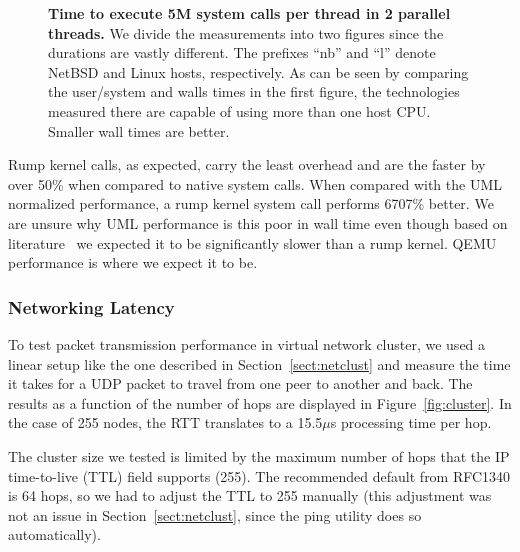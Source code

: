 \begin{figure}
\caption[Time to execute 5M system calls per thread in 2 parallel threads]{
\textbf{Time to execute 5M system calls per thread in 2 parallel threads.}
We divide the measurements into two figures since the durations are
vastly different.  The prefixes ``nb'' and ``l'' denote NetBSD and Linux
hosts, respectively.  As can be seen by comparing the user/system and
walls times in the first figure, the technologies measured there are
capable of using more than one host CPU.
Smaller wall times are better.
}
\label{fig:sandhoney}
\end{figure}
\clearpage

Rump kernel calls, as expected, carry the least overhead and are
the faster by over 50\% when compared to native system calls.  When
compared with the UML normalized performance, a rump kernel system
call performs 6707\% better.  We are unsure why UML performance is
this poor in wall time even though based on
literature~\cite{barham:xen,leslie:wombat} we expected it to be
significantly slower than a rump kernel.  QEMU performance is where
we expect it to be.

\subsubsection{Networking Latency}

To test packet transmission performance in virtual network cluster,
we used a linear setup like the one described in
Section~\ref{sect:netclust} and measure the time it takes for a
UDP packet to travel from one peer to another and back.  The results
as a function of the number of hops are displayed in Figure~\ref{fig:cluster}.
In the case of 255 nodes, the RTT translates to a 15.5$\mu$s
processing time per hop.

The cluster size we tested is limited by the maximum number of hops
that the IP time-to-live (TTL) field supports (255).  The recommended
default from RFC1340 is 64 hops, so we had to adjust the TTL to
255 manually (this adjustment was not an issue in Section~\ref{sect:netclust}, since
the ping utility does so automatically).

